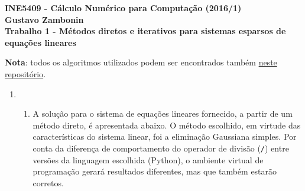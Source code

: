 \documentclass{article}
\newenvironment{arabenum}{
    \begin{enumerate}[label=\textbf{\arabic*})]
}{
    \end{enumerate}
}
\newenvironment{alphenum}{
    \begin{enumerate}[label=(\alph*)]
}{
    \end{enumerate}
}
\begin{document}
{\bf \noindent INE5409 - Cálculo Numérico para Computação (2016/1) \\
Gustavo Zambonin \\
Trabalho 1 - Métodos diretos e iterativos
para sistemas esparsos de equações lineares \\
}

\noindent \textbf{Nota}: todos os algoritmos utilizados podem ser encontrados
também \href{https://github.com/zambonin/ufsc-ine5409}{neste repositório}.

\begin{arabenum}

\item \begin{alphenum}

\item A solução para o sistema de equações lineares fornecido, a partir de um
método direto, é apresentada abaixo. O método escolhido, em virtude das
características do sistema linear, foi a eliminação Gaussiana simples.
Por conta da diferença de comportamento do operador de divisão
(\texttt{/}) entre versões da linguagem escolhida (Python), o ambiente
virtual de programação gerará resultados diferentes, mas que também
estarão corretos.


\end{alphenum}
\end{arabenum}
\end{document}
